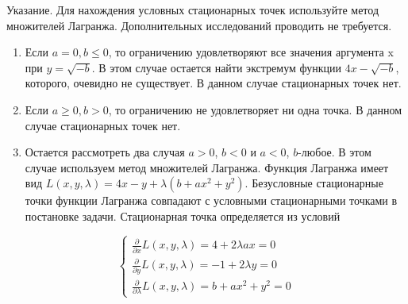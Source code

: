 \documentclass[addpoints]{exam} %
\begin{document}
\begin{questions}

Указание. Для нахождения условных стационарных точек используйте метод множителей Лагранжа. Дополнительных исследований проводить не требуется. 

\begin{solution}
\begin{enumerate}
\item Если $a=0,b\le 0$, то ограничению удовлетворяют все значения аргумента x при $y=\sqrt{-b} $. В этом случае остается найти экстремум функции $4x-\sqrt{-b} $, которого, очевидно не существует. В данном случае стационарных точек нет. 

\item  Если $a\ge 0,b>0$, то ограничению не удовлетворяет ни одна точка. В данном случае стационарных точек нет.

\item  Остается рассмотреть два случая $a>0$, $b<0$ и $a<0$, $b$-любое. В этом случае используем метод множителей Лагранжа. Функция Лагранжа имеет вид $L\left(x,y,\lambda \right)=4x-y+\lambda \left(b+ax^{2} +y^{2} \right)$. Безусловные стационарные точки функции Лагранжа совпадают с условными стационарными точками в постановке задачи. Стационарная точка определяется из условий 
\end{enumerate}

\[
\left\{\begin{array}{c} {\frac{\partial }{\partial x} L\left(x,y,\lambda \right)=4+2\lambda ax=0} \\ {\frac{\partial }{\partial y} L\left(x,y,\lambda \right)=-1+2\lambda y=0} \\ {\frac{\partial }{\partial \lambda } L\left(x,y,\lambda \right)=b+ax^{2} +y^{2} =0} \end{array}\right. 
\]


\end{solution}
\end{questions}
\end{document}
